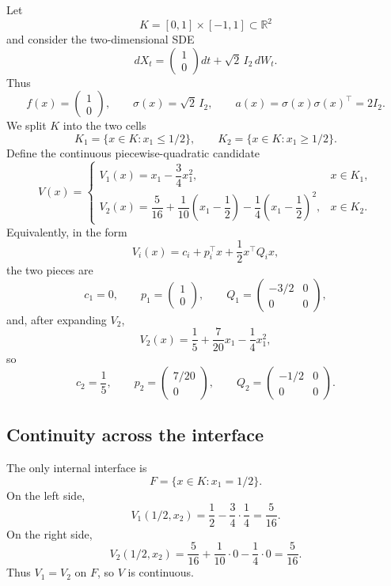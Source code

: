 \documentclass[10pt]{extarticle}
\begin{document}
Let
\[
  K=[0,1]\times[-1,1]\subset\mathbb R^2
\]
and consider the two-dimensional SDE
\begin{equation}
  dX_t=
  \begin{pmatrix}1\\0\end{pmatrix}dt
  +\sqrt{2}\,I_2\,dW_t.
  \label{eq:example-2d-sde}
\end{equation}
Thus
\[
  f(x)=
  \begin{pmatrix}1\\0\end{pmatrix},
  \qquad
  \sigma(x)=\sqrt{2}\,I_2,
  \qquad
  a(x)=\sigma(x)\sigma(x)^\top=2I_2.
\]
We split $K$ into the two cells
\[
  K_1=\{x\in K:x_1\leq 1/2\},
  \qquad
  K_2=\{x\in K:x_1\geq 1/2\}.
\]
Define the continuous piecewise-quadratic candidate
\begin{equation}
  V(x)=
  \begin{cases}
    V_1(x)=x_1-\dfrac34x_1^2,
      &x\in K_1,\\[0.8em]
    V_2(x)=\dfrac{5}{16}
      +\dfrac{1}{10}\left(x_1-\dfrac12\right)
      -\dfrac14\left(x_1-\dfrac12\right)^2,
      &x\in K_2.
  \end{cases}
  \label{eq:example-2d-certificate}
\end{equation}
Equivalently, in the form
\[
  V_i(x)=c_i+p_i^\top x+\frac12x^\top Q_i x,
\]
the two pieces are
\[
  c_1=0,
  \qquad
  p_1=
  \begin{pmatrix}1\\0\end{pmatrix},
  \qquad
  Q_1=
  \begin{pmatrix}
    -3/2&0\\
    0&0
  \end{pmatrix},
\]
and, after expanding $V_2$,
\[
  V_2(x)=\frac15+\frac{7}{20}x_1-\frac14x_1^2,
\]
so
\[
  c_2=\frac15,
  \qquad
  p_2=
  \begin{pmatrix}7/20\\0\end{pmatrix},
  \qquad
  Q_2=
  \begin{pmatrix}
    -1/2&0\\
    0&0
  \end{pmatrix}.
\]

\subsection{Continuity across the interface}

The only internal interface is
\[
  F=\{x\in K:x_1=1/2\}.
\]
On the left side,
\[
  V_1(1/2,x_2)
  =
  \frac12-\frac34\cdot\frac14
  =
  \frac{5}{16}.
\]
On the right side,
\[
  V_2(1/2,x_2)
  =
  \frac{5}{16}
  +\frac{1}{10}\cdot0
  -\frac14\cdot0
  =
  \frac{5}{16}.
\]
Thus $V_1=V_2$ on $F$, so $V$ is continuous.
\end{document}
